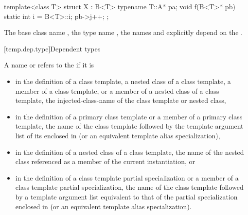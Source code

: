 \pnum
\begin{example}
\begin{codeblock}
template<class T> struct X : B<T> {
  typename T::A* pa;
  void f(B<T>* pb) {
    static int i = B<T>::i;
    pb->j++;
  }
};
\end{codeblock}

The base class name
,
the type name
,
the names
and
explicitly depend on the
.
\end{example}

[temp.dep.type]{Dependent types}

\pnum
A name or  refers to the
if it is
\begin{itemize}
\item
in the definition of a class template, a nested class of a class template,
a member of a class template, or a member of a nested class of a class template,
the injected-class-name of the class template or nested class,
\item
in the definition of a primary class template
or a member of a primary class template, the name of the
class template followed by the template argument list of
its  enclosed in
\tcode{<>} (or an equivalent template alias specialization),
\item
in the definition of a nested class of a class template,
the name of the nested class referenced as a member of the
current instantiation, or
\item
in the definition of a class template partial specialization
or a member of a class template partial specialization, the name of
the class template followed by a template argument list
equivalent to that of the partial specialization
enclosed in \tcode{<>} (or an equivalent template alias specialization).
\end{itemize}

